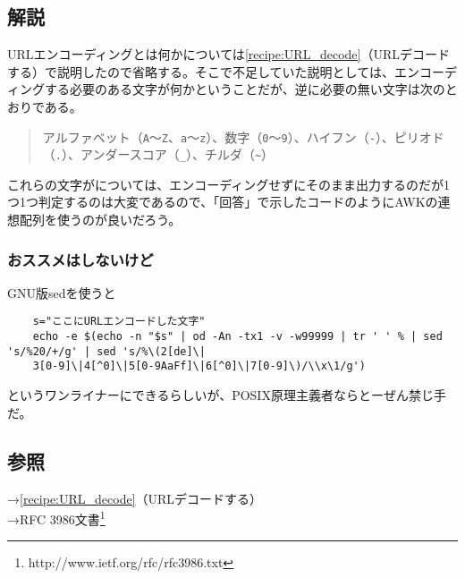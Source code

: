 \subsection*{解説}
URLエンコーディングとは何かについては\ref{recipe:URL_decode}（URLデコードする）で説明したので省略する。そこで不足していた説明としては、エンコーディングする必要のある文字が何かということだが、逆に必要の無い文字は次のとおりである。

\begin{quote}
  アルファベット（\verb|A|～\verb|Z|、\verb|a|～\verb|z|）、数字（\verb|0|～\verb|9|）、ハイフン（\verb|-|）、ピリオド（\verb|.|）、アンダースコア（\verb|_|）、チルダ（\verb|~|）
\end{quote}

これらの文字がについては、エンコーディングせずにそのまま出力するのだが1つ1つ判定するのは大変であるので、「回答」で示したコードのようにAWKの連想配列を使うのが良いだろう。

\subsubsection*{おススメはしないけど}

GNU版sedを使うと\\
\begin{frameboxit}{160.0mm}
\begin{verbatim}
	s="ここにURLエンコードした文字"
	echo -e $(echo -n "$s" | od -An -tx1 -v -w99999 | tr ' ' % | sed 's/%20/+/g' | sed 's/%\(2[de]\|
	3[0-9]\|4[^0]\|5[0-9AaFf]\|6[^0]\|7[0-9]\)/\\x\1/g')
\end{verbatim}
\end{frameboxit}
というワンライナーにできるらしいが、POSIX原理主義者ならとーぜん禁じ手だ。

\subsection*{参照}

\noindent
→\ref{recipe:URL_decode}（URLデコードする）\\
→RFC 3986文書\footnote{http://www.ietf.org/rfc/rfc3986.txt}
